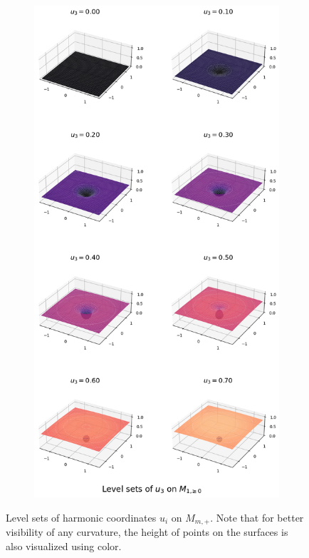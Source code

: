 \documentclass[titlepage,numbers=noenddot,oneside,%
cleardoublepage=empty,paper=a4,fontsize=11pt,%
english,%
]{scrartcl}
\begin{document}
\begin{figure}
    \begin{subfigure}{.49\textwidth}
        \includegraphics[width=\textwidth]{figures/level_sets_u3_unmodified.png}
    \end{subfigure}
    \caption{Level sets of harmonic coordinates \( u_i \) on \( M_{m,+} \). Note that for better visibility of any curvature, the height of points on the surfaces is also visualized using color.}
    \label{fig:level_sets_unmodified}
\end{figure}
\end{document}
